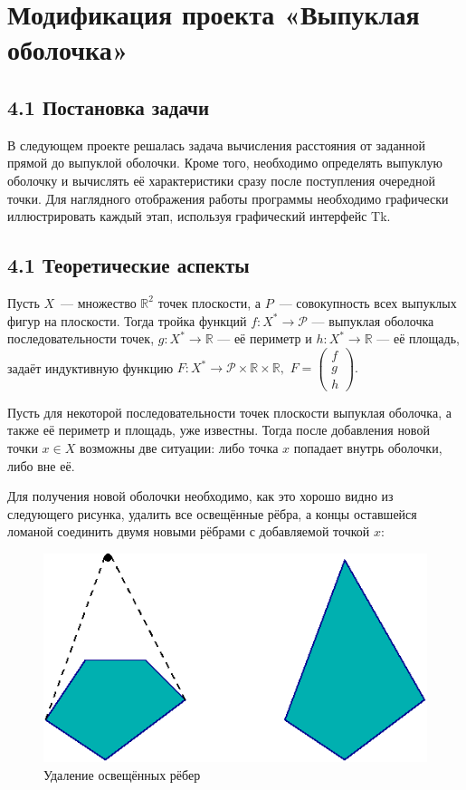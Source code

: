 \section{Модификация проекта «Выпуклая оболочка»}
\subsection*{4.1 Постановка задачи}
В следующем проекте решалась задача вычисления расстояния от заданной прямой
до выпуклой оболочки. Кроме того, необходимо определять выпуклую оболочку и
 вычислять её характеристики сразу после поступления очередной точки. Для наглядного
  отображения работы программы необходимо графически иллюстрировать каждый этап,
   используя графический интерфейс Tk.

\subsection*{4.1 Теоретические аспекты}

 Пусть $X$~--- множество $\mathbb{R}^2$ точек плоскости,
  а $P$~--- совокупность всех выпуклых фигур на плоскости.
   Тогда тройка функций $f\colon X^* \rightarrow \mathcal{P}$ — выпуклая оболочка
    последовательности точек, $g\colon X^* \rightarrow \mathbb{R}$  — её периметр
     и  $h\colon X^* \rightarrow \mathbb{R}$ — её площадь, задаёт индуктивную
функцию $F\colon X^* \rightarrow \mathcal{P} \times \mathbb{R} \times \mathbb{R},$ $F = \begin{pmatrix}f\\ g\\ h\end{pmatrix}.$

 Пусть для некоторой последовательности точек плоскости выпуклая оболочка,
  а также её периметр и площадь, уже известны. Тогда после добавления
новой точки $x\in X$ возможны две ситуации: либо точка $x$ попадает внутрь оболочки,
 либо вне её.

Для получения новой оболочки необходимо, как это хорошо видно
 из следующего рисунка, удалить все освещённые рёбра, а концы оставшейся ломаной
  соединить двумя новыми рёбрами с добавляемой точкой $x$:
\begin{figure}[ht!]
\begin{center}
\includegraphics[width=0.4\hsize]{images/conv_2}
\end{center}
\caption{Удаление освещённых рёбер}\label{fig:conv_2}
\end{figure}

